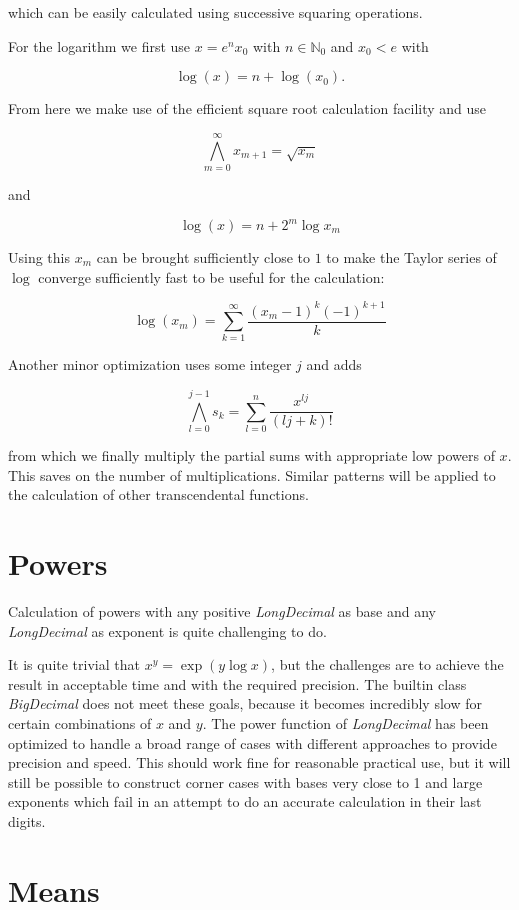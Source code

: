 \documentclass[10pt,a4paper]{article}
\begin{document}
which can be easily calculated using successive squaring operations.

For the logarithm we first use $x = e^n x_0$ with $n \in \mathbb{N}_0$ and $x_0 < e$ with

$$\log(x) = n + \log(x_0).$$

From here we make use of the efficient square root calculation facility and use 

$$\bigwedge_{m=0}^\infty x_{m+1} = \sqrt{x_m}$$

and

$$\log(x) = n + 2^m \log x_m$$

Using this $x_m$ can be brought sufficiently close to $1$ to make the Taylor series of $\log$ converge sufficiently fast to be useful for the calculation:

$$\log(x_m) = \sum_{k=1}^\infty \frac{(x_m-1)^k(-1)^{k+1}}{k}$$

Another minor optimization uses some integer $j$ and adds

$$ \bigwedge_{l=0}^{j-1} s_k = \sum_{l=0}^n \frac{x^{lj}}{(lj+k)!}$$

from which we finally multiply the partial sums with appropriate low powers of $x$.  This saves on the number of multiplications.
Similar patterns will be applied to the calculation of other transcendental functions.

\pagebreak

\section{Powers}

Calculation of powers with any positive {\slshape LongDecimal\/} as base and any {\slshape LongDecimal\/} as exponent is quite challenging to do.

It is quite trivial that $x^y = \exp(y \log x)$, but the challenges
are to achieve the result in acceptable time and with the required
precision.  The builtin class {\slshape BigDecimal} does not meet
these goals, because it becomes incredibly slow for certain
combinations of $x$ and $y$.  The power function of {\slshape LongDecimal\/} has
been optimized to handle a broad range of cases with different
approaches to provide precision and speed. This should work fine for
reasonable practical use, but it will still be possible to construct
corner cases with bases very close to 1 and large exponents which fail
in an attempt to do an accurate calculation in their last digits.

\section{Means}
\end{document}

